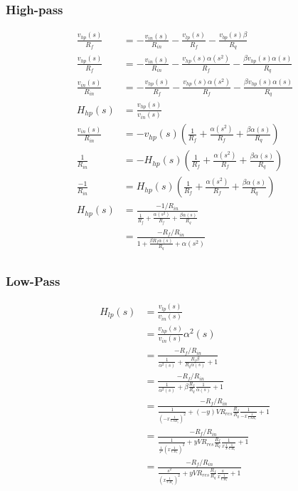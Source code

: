 \documentclass{article}
\begin{document}
\subsubsection{High-pass}

\begin{equation*}
\begin{split}
  \frac{v_{hp}(s)}{R_{f}} & = - \frac{v_{in}(s)}{R_{in}} - \frac{v_{lp}(s)}{R_{f}} - \frac{v_{bp}(s)\beta}{R_q} \\
  \frac{v_{hp}(s)}{R_{f}} & = - \frac{v_{in}(s)}{R_{in}} - \frac{v_{hp}(s)\alpha(s^2)}{R_{f}} - \frac{{\beta}v_{hp}(s)\alpha(s)}{R_q} \\
  \frac{v_{in}(s)}{R_{in}} & = - \frac{v_{hp}(s)}{R_{f}} - \frac{v_{hp}(s)\alpha(s^2)}{R_{f}} - \frac{{\beta}v_{hp}(s)\alpha(s)}{R_q} \\
  H_{hp}(s) & = \frac{v_{hp}(s)}{v_{in}(s)} \\
  \frac{v_{in}(s)}{R_{in}} & = - v_{hp}(s)(\frac{1}{R_{f}} + \frac{\alpha(s^2)}{R_{f}} + \frac{{\beta}\alpha(s)}{R_q}) \\
  \frac{1}{R_{in}} & = - H_{hp}(s)(\frac{1}{R_{f}} + \frac{\alpha(s^2)}{R_{f}} + \frac{{\beta}\alpha(s)}{R_q}) \\
  \frac{-1}{R_{in}} & = H_{hp}(s)(\frac{1}{R_{f}} + \frac{\alpha(s^2)}{R_{f}} + \frac{{\beta}\alpha(s)}{R_q}) \\
  H_{hp}(s) & = \frac{-1/R_{in}}{\frac{1}{R_{f}} + \frac{\alpha(s^2)}{R_{f}} + \frac{{\beta}\alpha(s)}{R_q}} \\
  & = \frac{-R_{f}/R_{in}}{1 + \frac{{\beta}R_{f}\alpha(s)}{R_q} + \alpha(s^2) } \\
\end{split}
\end{equation*}

\subsubsection{Low-Pass}

\begin{equation*}
\begin{split}
  H_{lp}(s) & = \frac{v_{lp}(s)}{v_{in}(s)} \\
            & = \frac{v_{hp}(s)}{v_{in}(s)}\alpha^2(s) \\
            & = \frac{-R_{f}/R_{in}}{\frac{1}{\alpha^2(s)} + \frac{R_{f}\beta}{R_q\alpha(s)} + 1 } \\
            & = \frac{-R_{f}/R_{in}}{\frac{1}{\alpha^2(s)} + \beta\frac{R_{f}}{R_q}\frac{1}{\alpha(s)} + 1 } \\
            & = \frac{-R_{f}/R_{in}}{\frac{1}{{(-x\frac{1}{CsR_{i}})}^2} + (-y)VR_{res}\frac{R_{f}}{R_q}\frac{1}{-x\frac{1}{CsR_{i}}} + 1 } \\
            & = \frac{-R_{f}/R_{in}}{\frac{1}{{\frac{1}{s^2}(x\frac{1}{CR_{i}})}^2} + yVR_{res}\frac{R_{f}}{R_q}\frac{1}{x\frac{1}{s}\frac{1}{CR_{i}}} + 1 } \\
            & = \frac{-R_{f}/R_{in}}{\frac{s^2}{{(x\frac{1}{CR_{i}})}^2} + yVR_{res}\frac{R_{f}}{R_q}\frac{s}{x\frac{1}{CR_{i}}} + 1 } \\
\end{split}
\end{equation*}
\end{document}

